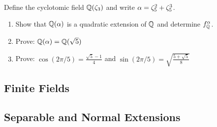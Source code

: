     \begin{ex}{21.30}
        Define the cyclotomic field $\mathbb{Q}(\zeta_3)$ and write $\alpha=\zeta_5^2+\zeta_5^3$.
        \begin{enumerate}
            \item Show that $\mathbb{Q}(\alpha)$ is a quadratic extension of $\mathbb{Q}$ and determine $f^\alpha_{\mathbb{Q}}$.
            \item Prove: $\mathbb{Q}(\alpha)=\mathbb{Q}(\sqrt{5})$
            \item Prove: $\cos(2\pi/5)=\frac{\sqrt{5}-1}{4}$ and $\sin(2\pi/5)=\sqrt{\frac{5+\sqrt{5}}{8}}$
        \end{enumerate}
    \end{ex}
\subsection{Finite Fields}

\subsection{Separable and Normal Extensions}